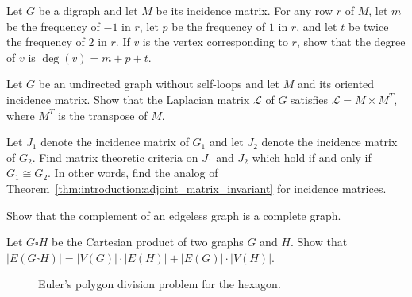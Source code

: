 \begin{problem}
\item Let $G$ be a digraph and let $M$ be its incidence matrix. For
  any row $r$ of $M$, let $m$ be the frequency of $-1$ in $r$, let
  $p$ be the frequency of $1$ in $r$, and let $t$ be twice the
  frequency of $2$ in $r$. If $v$ is the vertex corresponding to
  $r$, show that the degree of $v$ is $\deg(v) = m + p + t$.

\item Let $G$ be an undirected graph without self-loops and let $M$
  and its oriented incidence matrix. Show that the Laplacian matrix
  $\mathcal{L}$ of $G$ satisfies $\mathcal{L} = M \times M^T$, where
  $M^T$ is the transpose of $M$.

\item Let $J_1$ denote the incidence matrix of $G_1$ and let $J_2$
  denote the incidence matrix of $G_2$. Find matrix theoretic criteria
  on $J_1$ and $J_2$ which hold if and only if $G_1 \cong G_2$. In
  other words, find the analog of
  Theorem~\ref{thm:introduction:adjoint_matrix_invariant} for
  incidence matrices.

\item Show that the complement of an edgeless graph is a complete
  graph.

\item Let $G \square H$ be the Cartesian product of two graphs $G$ and
  $H$. Show that
  $|E(G \square H)| = |V(G)| \cdot |E(H)| + |E(G)| \cdot |V(H)|$.

\begin{figure}[!htbp]
\centering
{}

\caption{Euler's polygon division problem for the hexagon.}
\label{fig:introduction:Euler_polygon_division_hexagon}
\end{figure}


\end{problem}
